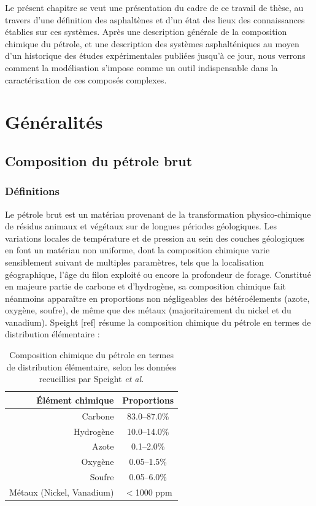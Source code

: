 Le présent chapitre se veut une présentation du cadre de ce travail de thèse, au travers d'une définition des asphaltènes et d'un état des lieux des connaissances établies sur ces systèmes. Après une description générale de la composition chimique du pétrole, et une description des systèmes asphalténiques au moyen d'un historique des études expérimentales publiées jusqu'à ce jour, nous verrons comment la modélisation s'impose comme un outil indispensable dans la caractérisation de ces composés complexes. 




\section{Généralités}

\subsection{Composition du pétrole brut}

\subsubsection{Définitions}

Le pétrole brut est un matériau provenant de la transformation physico-chimique de résidus animaux et végétaux sur de longues périodes géologiques. Les variations locales de température et de pression au sein des couches géologiques en font un matériau non uniforme, dont la composition chimique varie sensiblement suivant de multiples paramètres, tels que la localisation géographique, l'âge du filon exploité ou encore la profondeur de forage. Constitué en majeure partie de carbone et d'hydrogène, sa composition chimique fait néanmoins apparaître en proportions non négligeables des hétéroélements (azote, oxygène, soufre), de même que des métaux (majoritairement du nickel et du vanadium). Speight [ref] résume la composition chimique du pétrole en termes de distribution élémentaire : 

\begin{table}[h!]
	\begin{center}
		\begin{tabular}{r|c}
			\hline
			Élément chimique & Proportions \\
			\hline
			Carbone & 83.0--87.0\% \\
			Hydrogène & 10.0--14.0\% \\
			Azote & 0.1--2.0\% \\
			Oxygène & 0.05--1.5\% \\
			Soufre & 0.05--6.0\% \\
			Métaux (Nickel, Vanadium) & $<$1000 ppm \\
			\hline
		\end{tabular}
	\end{center}
	\caption{Composition chimique du pétrole en termes de distribution élémentaire, selon les données recueillies par Speight \textit{et al.}}
	\label{DESpeight}
\end{table}

